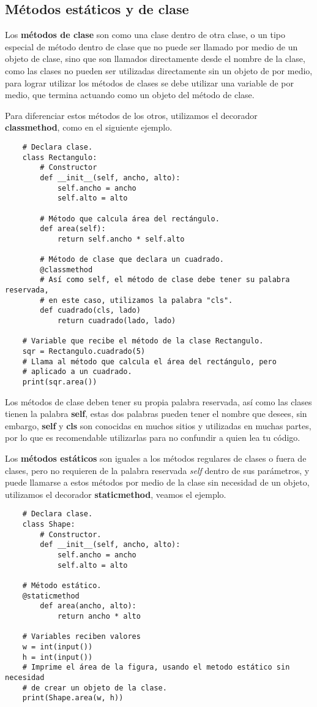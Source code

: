 \subsection{Métodos estáticos y de clase}

Los \textbf{métodos de clase} son como una clase dentro de otra clase, o un tipo especial de método dentro de clase que no puede ser llamado por medio de un objeto de clase, sino que son llamados directamente desde el nombre de la clase, como las clases no pueden ser utilizadas directamente sin un objeto de por medio, para lograr utilizar los métodos de clases se debe utilizar una variable de por medio, que termina actuando como un objeto del método de clase.

Para diferenciar estos métodos de los otros, utilizamos el decorador \textbf{classmethod}, como en el siguiente ejemplo.
\begin{lstlisting}
    # Declara clase.
    class Rectangulo:
        # Constructor
        def __init__(self, ancho, alto):
            self.ancho = ancho
            self.alto = alto

        # Método que calcula área del rectángulo.
        def area(self):
            return self.ancho * self.alto

        # Método de clase que declara un cuadrado.
        @classmethod
        # Así como self, el método de clase debe tener su palabra reservada,
        # en este caso, utilizamos la palabra "cls".
        def cuadrado(cls, lado)
            return cuadrado(lado, lado)

    # Variable que recibe el método de la clase Rectangulo.
    sqr = Rectangulo.cuadrado(5)
    # Llama al método que calcula el área del rectángulo, pero
    # aplicado a un cuadrado.
    print(sqr.area())
\end{lstlisting}

Los métodos de clase deben tener su propia palabra reservada, así como las clases tienen la palabra \textbf{self}, estas dos palabras pueden tener el nombre que desees, sin embargo, \textbf{self} y \textbf{cls} son conocidas en muchos sitios y utilizadas en muchas partes, por lo que es recomendable utilizarlas para no confundir a quien lea tu código.

Los \textbf{métodos estáticos} son iguales a los métodos regulares de clases o fuera de clases, pero no requieren de la palabra reservada \textit{self} dentro de sus parámetros, y puede llamarse a estos métodos por medio de la clase sin necesidad de un objeto, utilizamos el decorador \textbf{staticmethod}, veamos el ejemplo.
\begin{lstlisting}
    # Declara clase.
    class Shape:
        # Constructor.
        def __init__(self, ancho, alto):
            self.ancho = ancho
            self.alto = alto

    # Método estático.
    @staticmethod
        def area(ancho, alto):
            return ancho * alto

    # Variables reciben valores
    w = int(input())
    h = int(input())
    # Imprime el área de la figura, usando el metodo estático sin necesidad
    # de crear un objeto de la clase.
    print(Shape.area(w, h))
\end{lstlisting}


